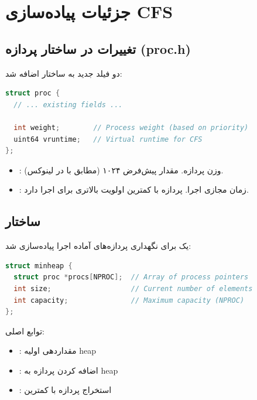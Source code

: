 \documentclass[12pt,a4paper]{article}
\begin{document}
\section{جزئیات پیاده‌سازی CFS}

\subsection{تغییرات در ساختار پردازه (proc.h)}
دو فیلد جدید به ساختار  اضافه شد:

\begin{latin}
\begin{lstlisting}[language=C, caption={فیلدهای جدید در struct proc}]
struct proc {
  // ... existing fields ...
  
  int weight;        // Process weight (based on priority)
  uint64 vruntime;   // Virtual runtime for CFS
};
\end{lstlisting}
\end{latin}

\begin{itemize}
    \item {}: وزن پردازه. مقدار پیش‌فرض ۱۰۲۴ (مطابق با  در لینوکس).
    \item {}: زمان مجازی اجرا. پردازه با کمترین  اولویت بالاتری برای اجرا دارد.
\end{itemize}

\subsection{ساختار }
یک  برای نگهداری پردازه‌های آماده اجرا پیاده‌سازی شد:

\begin{latin}
\begin{lstlisting}[language=C, caption={ساختار Min-Heap}]
struct minheap {
  struct proc *procs[NPROC];  // Array of process pointers
  int size;                   // Current number of elements
  int capacity;               // Maximum capacity (NPROC)
};
\end{lstlisting}
\end{latin}

توابع اصلی:
\begin{itemize}
    \item {}: مقداردهی اولیه heap
    \item {}: اضافه کردن پردازه به heap
    \item {}: استخراج پردازه با کمترین 
\end{itemize}
\end{document}
